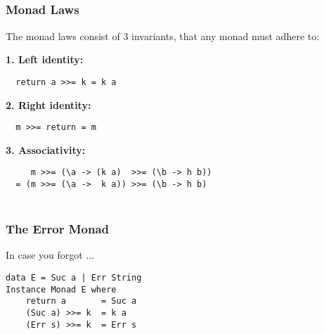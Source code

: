 \documentclass{beamer}
\newcommand{\bind}{\texttt{>>=}}
\newcommand{\ret}{\texttt{return}}
\newcommand{\bs}{\texttt{\char`\\}}
\newcommand{\at}{\texttt{a}}
\newcommand{\mt}{\texttt{k}}
\begin{document}
\subsection{}
\begin{frame}[fragile]
 \frametitle{Monad Laws}
The monad laws consist of 3 invariants, that any monad must adhere to:

\textbf{1. Left identity:}
\begin{lstlisting}
  return a >>= k = k a
\end{lstlisting}

\textbf{2. Right identity:}
\begin{lstlisting}
  m >>= return = m
\end{lstlisting}

\textbf{3. Associativity:}
\begin{lstlisting}
     m >>= (\a -> (k a)  >>= (\b -> h b)) 
  = (m >>= (\a ->  k a)) >>= (\b -> h b)
\end{lstlisting}
\begin{align*}
\end{align*}
\end{frame}
\begin{frame}[fragile]
\frametitle{The Error Monad}
In case you forgot $\ldots$
\begin{lstlisting}
data E = Suc a | Err String
Instance Monad E where
    return a       = Suc a     
    (Suc a) >>= k  = k a
    (Err s) >>= k  = Err s
\end{lstlisting}
\end{frame}
\end{document}
